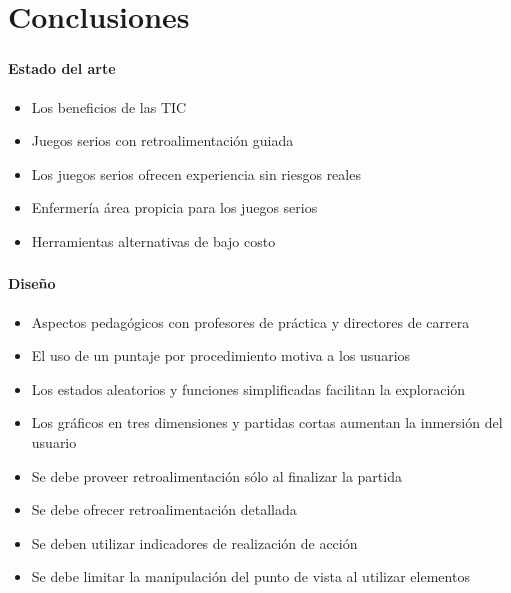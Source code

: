\section{Conclusiones}
\setcounter{sectiontotal}{4}

\begin{frame}
\frametitle{\pagetitle}
\framesubtitle{Estado del arte}
\begin{itemize}[<+->]

\item Los beneficios de las TIC

\item Juegos serios con retroalimentación guiada

\item Los juegos serios ofrecen experiencia sin riesgos reales

\item Enfermería área propicia para los juegos serios

\item Herramientas alternativas de bajo costo

\end{itemize}
\end{frame}
\begin{frame}
\frametitle{\pagetitle}
\framesubtitle{Diseño}
\begin{itemize}[<+->]


\item Aspectos pedagógicos con profesores de práctica y directores de
        carrera

\item El uso de un puntaje por procedimiento motiva a los usuarios

\item Los estados aleatorios y funciones simplificadas facilitan la exploración

\item Los gráficos en tres dimensiones y partidas cortas aumentan la inmersión del usuario

\item Se debe proveer retroalimentación sólo al finalizar la partida

\item Se debe ofrecer retroalimentación detallada

\item Se deben utilizar indicadores de realización de acción

\item Se debe limitar la manipulación del punto de vista al utilizar elementos

\end{itemize}
\end{frame}

